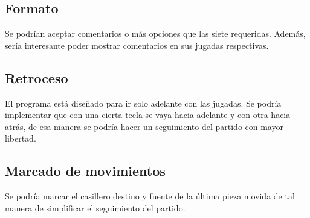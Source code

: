 \documentclass[a4paper,10pt]{article}
\begin{document}
\subsection{ Formato }

Se podrían aceptar comentarios o más opciones que las siete requeridas. Además, sería interesante poder mostrar comentarios en sus jugadas respectivas. 

\subsection{ Retroceso }

El programa está diseñado para ir solo adelante con las jugadas. Se podría implementar que con una cierta tecla se vaya hacia adelante y con otra hacia atrás, 
de esa manera se podría hacer un seguimiento del partido con mayor libertad.

\subsection{ Marcado de movimientos }

Se podría marcar el casillero destino y fuente de la última pieza  movida de tal manera de simplificar el seguimiento del partido.
   
\end{document}
